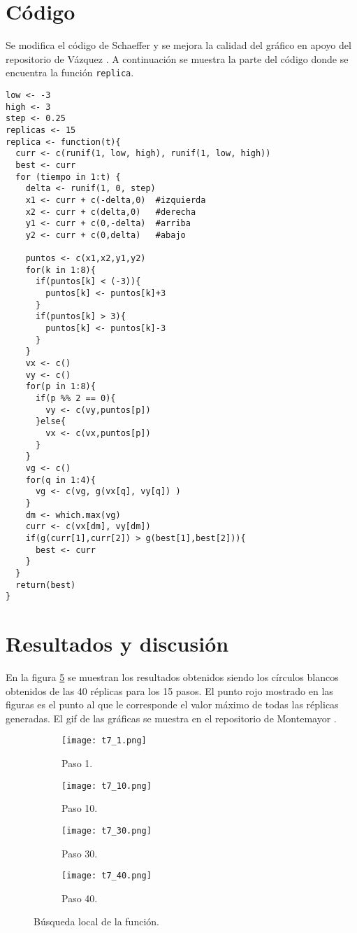 \documentclass[12pt]{amsart}
\begin{document}
\clearpage
\section{Código}
Se modifica el código de Schaeffer \cite{codigo} y se mejora la calidad del gráfico en apoyo del repositorio de Vázquez \cite{vazquez}. A continuación se muestra la parte del código donde se encuentra la función \texttt{replica}.
\renewcommand{\listingscaption}{Código}
\begin{listing}[H]
  \begin{verbatim}
low <- -3
high <- 3
step <- 0.25
replicas <- 15
replica <- function(t){
  curr <- c(runif(1, low, high), runif(1, low, high))
  best <- curr
  for (tiempo in 1:t) {
    delta <- runif(1, 0, step)
    x1 <- curr + c(-delta,0)  #izquierda
    x2 <- curr + c(delta,0)   #derecha
    y1 <- curr + c(0,-delta)  #arriba
    y2 <- curr + c(0,delta)   #abajo
    
    puntos <- c(x1,x2,y1,y2)
    for(k in 1:8){
      if(puntos[k] < (-3)){
        puntos[k] <- puntos[k]+3 
      }
      if(puntos[k] > 3){
        puntos[k] <- puntos[k]-3
      }
    }
    vx <- c()
    vy <- c()
    for(p in 1:8){
      if(p %% 2 == 0){
        vy <- c(vy,puntos[p])
      }else{
        vx <- c(vx,puntos[p])
      }
    }
    vg <- c()
    for(q in 1:4){
      vg <- c(vg, g(vx[q], vy[q]) )
    }
    dm <- which.max(vg)
    curr <- c(vx[dm], vy[dm])
    if(g(curr[1],curr[2]) > g(best[1],best[2])){
      best <- curr
    }
  }
  return(best)
}
  \end{verbatim}
  \label{codigo1}
\end{listing}
\clearpage

\section{Resultados y discusión}
En la figura \ref{fig2} se muestran los resultados obtenidos siendo los círculos blancos obtenidos de las 40 réplicas para los 15 pasos. El punto rojo mostrado en las figuras es el punto al que le corresponde el valor máximo de todas las réplicas generadas. El gif de las gráficas se muestra en el repositorio de Montemayor \cite{mtyor}.
\begin{figure}[h!]
\centering
\begin{subfigure}[b]{0.4\linewidth}
\texttt{[image: t7\_1.png]}
\caption{Paso 1.}
\label{a}
\end{subfigure}
\begin{subfigure}[b]{0.4\linewidth}
\texttt{[image: t7\_10.png]}
\caption{Paso 10.}
\label{b}
\end{subfigure}
\begin{subfigure}[b]{0.4\linewidth}
\texttt{[image: t7\_30.png]}
\caption{Paso 30.}
\label{c}
\end{subfigure}
\begin{subfigure}[b]{0.4\linewidth}
\texttt{[image: t7\_40.png]}
\caption{Paso 40.}
\label{d}
\end{subfigure}
\caption{Búsqueda local de la función.}
\label{fig2}
\end{figure}
\end{document}
